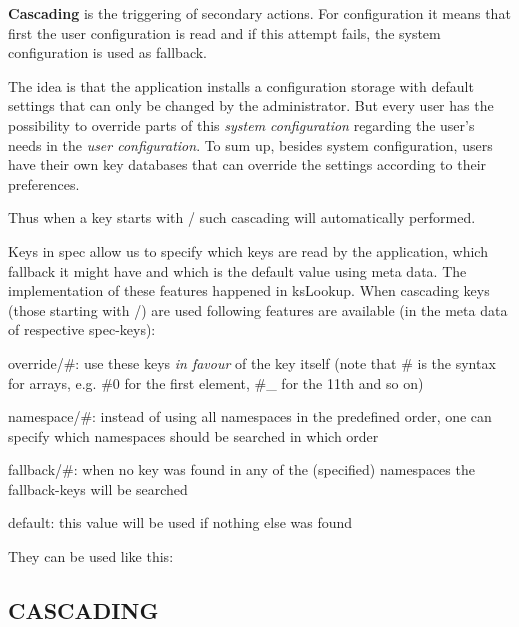 {\bfseries Cascading} is the triggering of secondary actions. For configuration it means that first the user configuration is read and if this attempt fails, the system configuration is used as fallback.

The idea is that the application installs a configuration storage with default settings that can only be changed by the administrator. But every user has the possibility to override parts of this {\itshape system configuration} regarding the user's needs in the {\itshape user configuration}. To sum up, besides system configuration, users have their own key databases that can override the settings according to their preferences.

Thus when a key starts with {\ttfamily /} such cascading will automatically performed.

Keys in {\ttfamily spec} allow us to specify which keys are read by the application, which fallback it might have and which is the default value using meta data. The implementation of these features happened in {\ttfamily ks\+Lookup}. When cascading keys (those starting with {\ttfamily /}) are used following features are available (in the meta data of respective {\ttfamily spec}-\/keys)\+:


\begin{DoxyItemize}
\item {\ttfamily override/\#}\+: use these keys {\itshape in favour} of the key itself (note that {\ttfamily \#} is the syntax for arrays, e.\+g. {\ttfamily \#0} for the first element, {\ttfamily \#\+\_} for the 11th and so on)
\item {\ttfamily namespace/\#}\+: instead of using all namespaces in the predefined order, one can specify which namespaces should be searched in which order
\item {\ttfamily fallback/\#}\+: when no key was found in any of the (specified) namespaces the {\ttfamily fallback}-\/keys will be searched
\item {\ttfamily default}\+: this value will be used if nothing else was found
\end{DoxyItemize}

They can be used like this\+: 


\subsection*{C\+A\+S\+C\+A\+D\+I\+N\+G}

